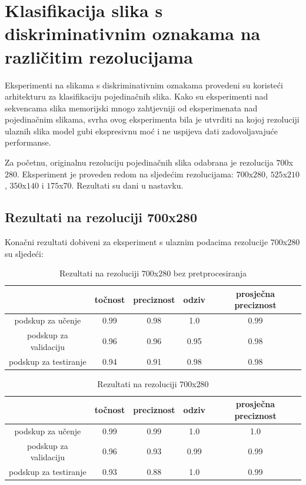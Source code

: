 \documentclass[times, utf8, diplomski, numeric]{fer}
\begin{document}
\section{Klasifikacija slika s diskriminativnim oznakama na različitim rezolucijama}
Eksperimenti na slikama s diskriminativnim oznakama provedeni su koristeći arhitekturu za klasifikaciju pojedinačnih slika. 
Kako su eksperimenti nad sekvencama slika memorijski mnogo zahtjevniji od eksperimenata nad pojedinačnim slikama, svrha ovog eksperimenta bila je utvrditi
na kojoj rezoluciji ulaznih slika model gubi ekspresivnu moć i ne uspijeva dati zadovoljavajuće performanse.

Za početnu, originalnu rezoluciju pojedinačnih slika odabrana je rezolucija $700$x$280$. Eksperiment je proveden redom na sljedećim rezolucijama:
$700$x$280$, $525$x$210$, $350$x$140$ i $175$x$70$. Rezultati su dani u nastavku.

\subsection{Rezultati na rezoluciji 700x280}
Konačni rezultati dobiveni za eksperiment s ulaznim podacima rezolucije $700$x$280$ su sljedeći:

\begin{table}[H]
\centering
\caption{Rezultati na rezoluciji $700$x$280$ bez pretprocesiranja}
\label{score:single_hand_700x280_no_preprocess}
\begin{tabular}{c|c|c|c|c|}
\cline{2-5}
                                            & točnost & preciznost & odziv & prosječna preciznost \\ \hline
\multicolumn{1}{|c|}{podskup za učenje}     & 0.99       & 0.98        & 1.0     &           0.99           \\ \hline
\multicolumn{1}{|c|}{podskup za validaciju} & 0.96       & 0.96        & 0.95     &            0.98          \\ \hline
\multicolumn{1}{|c|}{podskup za testiranje} & 0.94       & 0.91        & 0.98     &            0.98          \\ \hline
\end{tabular}
\end{table}

\begin{table}[H]
\centering
\caption{Rezultati na rezoluciji $700$x$280$}
\label{score:single_hand_700x280}
\begin{tabular}{c|c|c|c|c|}
\cline{2-5}
                                            & točnost & preciznost & odziv & prosječna preciznost \\ \hline
\multicolumn{1}{|c|}{podskup za učenje}     & 0.99       & 0.99        & 1.0     &           1.0           \\ \hline
\multicolumn{1}{|c|}{podskup za validaciju} & 0.96       & 0.93        & 0.99     &            0.99          \\ \hline
\multicolumn{1}{|c|}{podskup za testiranje} & 0.93       & 0.88        & 1.0     &            0.99          \\ \hline
\end{tabular}
\end{table}
\end{document}
